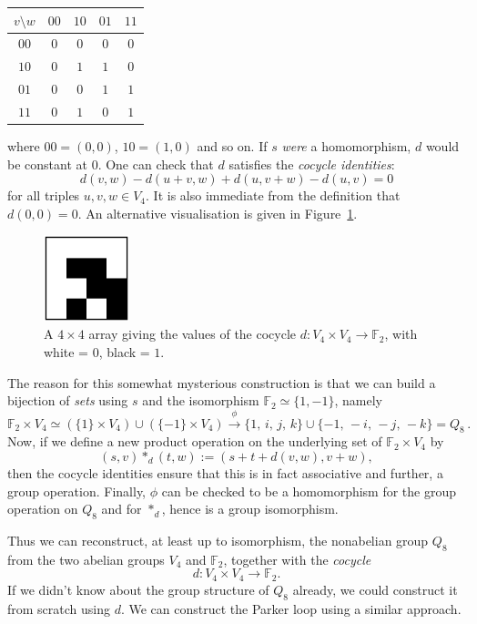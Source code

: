 \documentclass{article}
\theoremstyle{plain}
\theoremstyle{definition}
\def \FF {\mathbb{F}}
\begin{document}
\begin{center}
\begin{tabular*}{0.35\textwidth}{c|cccc}
$v\setminus w$&$00$&$10$&$01$&$11$\\
\hline
	$00$		& $0$& $0$& $0$& $0$\\
	$10$		& $0$& $1$& $1$& $0$\\
	$01$		& $0$& $0$& $1$& $1$\\
	$11$		& $0$& $1$& $0$& $1$\\
\end{tabular*}
\end{center}
where $00=(0,0)$, $10=(1,0)$ and so on.
If $s$ \emph{were} a homomorphism, $d$ would be constant at $0$.
One can check that $d$ satisfies the \emph{cocycle identities}:
\[
	d(v,w)-d(u+v,w)+d(u,v+w)-d(u,v) = 0
\]
for all triples $u,v,w\in V_4$. It is also immediate from the definition that $d(0,0)=0$.
An alternative visualisation is given in Figure~\ref{fig:cocycle for q8}.

\begin{figure}[!b]
\begin{center}
\includegraphics[height=2.5cm]{quaternion_cocyc} %
\end{center}
\caption{A $4\times4$ array giving the values of the cocycle $d\colon V_4\times V_4\to \FF_2$, with white = $0$, black = $1$.}
\label{fig:cocycle for q8}
\end{figure}


The reason for this somewhat mysterious construction is that we can build a bijection of \emph{sets} using $s$ and the isomorphism $\FF_2\simeq \{1,-1\}$, namely
\[
	\FF_2\times V_4 \simeq \left(\{1\}\times V_4\right) \cup \left(\{-1\} \times V_4\right) \stackrel{\phi}{\longrightarrow}
	\{1,\, i,\, j,\, k\}\cup \{-1,\, -i,\, -j,\, -k\} = Q_8\,.
\]
Now, if we define a new product operation on the underlying set of $\FF_2\times V_4$ by
\[
	(s,v)\ast_d(t,w):=(s+ t+ d(v,w),v+w),
\]
then the cocycle identities ensure that this is in fact associative and further, a group operation.
Finally, $\phi$ can be checked to be a homomorphism for the group operation on $Q_8$ and for $\ast_d$, hence is a group isomorphism.

Thus we can reconstruct, at least up to isomorphism, the nonabelian group $Q_8$ from the two abelian groups $V_4$ and $\FF_2$, together with the \emph{cocycle} 
\[
	d\colon V_4\times V_4\to \FF_2.
\]
If we didn't know about the group structure of $Q_8$ already, we could construct it from scratch using $d$.
We can construct the Parker loop using a similar approach.
\end{document}

